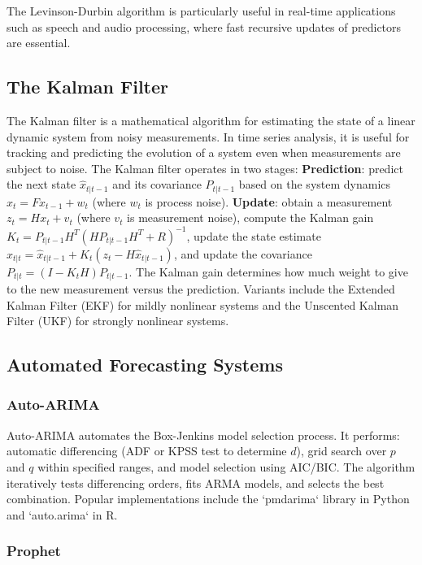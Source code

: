 \documentclass[11pt,a4paper]{article}
\begin{document}
The Levinson-Durbin algorithm is particularly useful in real-time applications such as speech and audio processing, where fast recursive updates of predictors are essential.

\subsection{The Kalman Filter}

The Kalman filter is a mathematical algorithm for estimating the state of a linear dynamic system from noisy measurements. In time series analysis, it is useful for tracking and predicting the evolution of a system even when measurements are subject to noise. The Kalman filter operates in two stages: \textbf{Prediction}: predict the next state $\hat{x}_{t|t-1}$ and its covariance $P_{t|t-1}$ based on the system dynamics $x_t = F x_{t-1} + w_t$ (where $w_t$ is process noise). \textbf{Update}: obtain a measurement $z_t = H x_t + v_t$ (where $v_t$ is measurement noise), compute the Kalman gain $K_t = P_{t|t-1} H^T (H P_{t|t-1} H^T + R)^{-1}$, update the state estimate $\hat{x}_{t|t} = \hat{x}_{t|t-1} + K_t (z_t - H \hat{x}_{t|t-1})$, and update the covariance $P_{t|t} = (I - K_t H) P_{t|t-1}$. The Kalman gain determines how much weight to give to the new measurement versus the prediction. Variants include the Extended Kalman Filter (EKF) for mildly nonlinear systems and the Unscented Kalman Filter (UKF) for strongly nonlinear systems.

\subsection{Automated Forecasting Systems}

\subsubsection{Auto-ARIMA}

Auto-ARIMA automates the Box-Jenkins model selection process. It performs: automatic differencing (ADF or KPSS test to determine $d$), grid search over $p$ and $q$ within specified ranges, and model selection using AIC/BIC. The algorithm iteratively tests differencing orders, fits ARMA models, and selects the best combination. Popular implementations include the `pmdarima` library in Python and `auto.arima` in R.

\subsubsection{Prophet}
\end{document}
